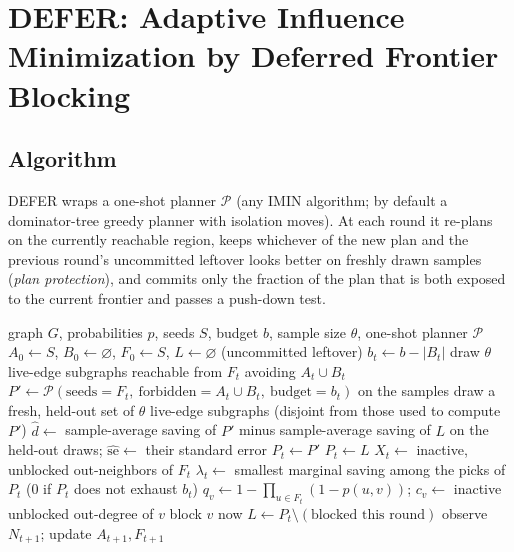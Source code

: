 \documentclass[preprint,11pt]{elsarticle}
\theoremstyle{definition}
\theoremstyle{remark}
\begin{document}
\section{DEFER: Adaptive Influence Minimization by Deferred Frontier Blocking}\label{sec:defer}

\subsection{Algorithm}\label{sec:defer-algo}

DEFER wraps a one-shot planner $\mathcal P$ (any IMIN algorithm; by default
a dominator-tree greedy planner with isolation moves). At each round it
re-plans on the currently reachable region, keeps whichever of the new plan
and the previous round's uncommitted leftover looks better on freshly drawn
samples (\emph{plan protection}), and commits only the fraction of the plan
that is both exposed to the current frontier and passes a push-down test.

\begin{algorithm}[h]
\caption{DEFER}\label{alg:defer}
\begin{algorithmic}[1]
\Require graph $G$, probabilities $p$, seeds $S$, budget $b$, sample size
  $\theta$, one-shot planner $\mathcal P$
\State $A_0\gets S$, $B_0\gets\varnothing$, $F_0\gets S$, $L\gets\varnothing$ (uncommitted leftover)
  \State $b_t\gets b-|B_t|$
  \State draw $\theta$ live-edge subgraphs reachable from $F_t$ avoiding $A_t\cup B_t$
  \State $P'\gets\mathcal P(\text{seeds}=F_t,\ \text{forbidden}=A_t\cup B_t,\ \text{budget}=b_t)$ on the samples
  \State draw a fresh, held-out set of $\theta$ live-edge subgraphs (disjoint from those used to compute $P'$)
  \State $\hat d\gets$ sample-average saving of $P'$ minus sample-average saving of $L$ on the held-out draws; $\widehat{\mathrm{se}}\gets$ their standard error
   
    \State $P_t\gets P'$
  \Else
    \State $P_t\gets L$
  \EndIf
  \State $X_t\gets$ inactive, unblocked out-neighbors of $F_t$
  \State $\lambda_t\gets$ smallest marginal saving among the picks of $P_t$ (0 if $P_t$ does not exhaust $b_t$)
  \label{alg:pushdown-start}
    \State $q_v\gets 1-\prod_{u\in F_t}(1-p(u,v))$; $c_v\gets$ inactive unblocked out-degree of $v$
     
      \State block $v$ now
    \EndIf
  \EndFor\label{alg:pushdown-end}
  \State $L\gets P_t\setminus(\text{blocked this round})$
  \State observe $N_{t+1}$; update $A_{t+1},F_{t+1}$
\EndFor
\end{algorithmic}
\end{algorithm}
\end{document}
